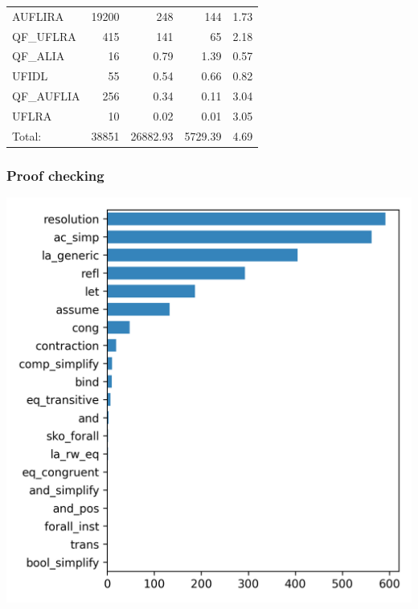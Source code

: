 \documentclass[usepdftitle=false,aspectratio=169]{beamer}
\begin{document}
\begin{frame}
\begin{minipage}{0.68 \textwidth}
\begin{tabular}{l|r|r|r|r}
      AUFLIRA & 19200 & 248 & 144 & 1.73 \\
      QF\_UFLRA & 415 & 141 & 65 & 2.18 \\
      QF\_ALIA & 16 & 0.79 & 1.39 & 0.57 \\
      UFIDL & 55 & 0.54 & 0.66 & 0.82 \\
      QF\_AUFLIA & 256 & 0.34 & 0.11 & 3.04 \\
      UFLRA & 10 & 0.02 & 0.01 & 3.05 \\
      \midrule
      Total: & 38851 & 26882.93 & 5729.39 & 4.69 \\
      \bottomrule
    \end{tabular}
  \end{minipage}
\end{frame}

\begin{frame}
  \frametitle{Proof checking}
  \begin{minipage}{0.48 \textwidth}
    \centering
    \includegraphics[height=0.9\textheight]{images/by-rules-total.png}
  \end{minipage}
  \hfill
  \begin{minipage}{0.48 \textwidth}
    \centering

\end{minipage}
\end{frame}
\end{document}
